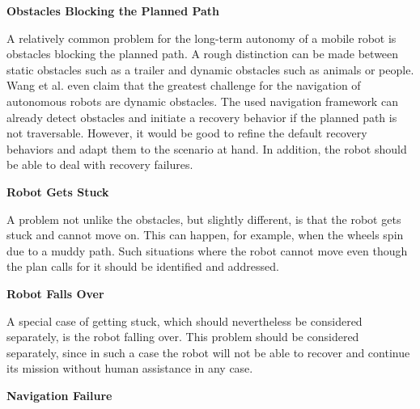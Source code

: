 \documentclass[english, master, utf8]{base/thesis_KBS}
\newcommand{\code}{\collectverb{\codebox}}
\begin{document}
\noindent
\textbf{Obstacles Blocking the Planned Path}\newline

\noindent
A relatively common problem for the long-term autonomy of a mobile robot is obstacles blocking the planned path.
A rough distinction can be made between static obstacles such as a trailer and dynamic obstacles such as animals or people.
Wang et al. \cite{Wang:2018} even claim that the greatest challenge for the navigation of autonomous robots are dynamic obstacles.
The used navigation framework \code{move_base_flex} can already detect obstacles and initiate a recovery behavior if the planned path is not traversable.
However, it would be good to refine the default recovery behaviors and adapt them to the scenario at hand. In addition, the robot should be able to deal with
recovery failures.\newline

\noindent
\textbf{Robot Gets Stuck}\newline

\noindent
A problem not unlike the obstacles, but slightly different, is that the robot gets stuck and cannot move on. This can happen, for example, when the wheels spin due 
to a muddy path. Such situations where the robot cannot move even though the plan calls for it should be identified and addressed.\newline

\noindent
\textbf{Robot Falls Over}\newline

\noindent
A special case of getting stuck, which should nevertheless be considered separately, is the robot falling over.
This problem should be considered separately, since in such a case the robot will not be able to recover and continue its mission without human assistance in any case.\newline

\noindent
\textbf{Navigation Failure}\newline
\end{document}

